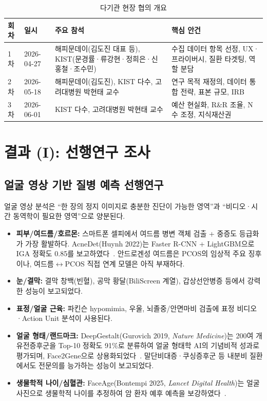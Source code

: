 \documentclass[11pt,a4paper]{article}
\begin{document}
\begin{table}[h]
\centering
\footnotesize
\renewcommand{\arraystretch}{1.25}
\caption{다기관 현장 협의 개요}
\label{tab:meetings}
\begin{tabularx}{\textwidth}{@{}p{0.8cm} p{2.0cm} L p{3.6cm}@{}}
\toprule
\textbf{회차} & \textbf{일시} & \textbf{주요 참석} & \textbf{핵심 안건} \\
\midrule
1차 & 2026-04-27 & 해피문데이(김도진 대표 등), KIST(문경률·류강현·정희은·신홍철·조수민) & 수집 데이터 항목 선정, UX·프라이버시, 질환 타겟팅, 역할 분담 \\
2차 & 2026-05-18 & 해피문데이(김도진), KIST 다수, 고려대병원 박현태 교수 & 연구 목적 재정의, 데이터 통합 전략, 표본 규모, IRB \\
3차 & 2026-06-01 & KIST 다수, 고려대병원 박현태 교수 & 예산 현실화, R\&R 조율, N수 조정, 지식재산권 \\
\bottomrule
\end{tabularx}
\end{table}

\section{결과 (I): 선행연구 조사}

\subsection{얼굴 영상 기반 질병 예측 선행연구}
얼굴 영상 분석은 ``한 장의 정지 이미지로 충분한 진단이 가능한 영역''과 ``비디오·시간 동역학이 필요한 영역''으로 양분된다.

\begin{itemize}
  \item \textbf{피부/여드름/호르몬:} 스마트폰 셀피에서 여드름 병변 객체 검출 + 중증도 등급화가 가장 활발하다. AcneDet(Huynh 2022)는 Faster R-CNN + LightGBM으로 IGA 정확도 0.85를 보고하였다~\cite{ref1}. 안드로겐성 여드름은 PCOS의 임상적 주요 징후이나, 여드름$\leftrightarrow$PCOS 직접 연계 모델은 아직 부재하다.
  \item \textbf{눈/결막:} 결막 창백(빈혈), 공막 황달(BiliScreen 계열), 갑상선안병증 등에서 강력한 성능이 보고되었다.
  \item \textbf{표정/얼굴 근육:} 파킨슨 hypomimia, 우울, 뇌졸중/안면마비 검출에 표정 비디오·Action Unit 분석이 사용된다.
  \item \textbf{얼굴 형태/랜드마크:} DeepGestalt(Gurovich 2019, \emph{Nature Medicine})는 200여 개 유전증후군을 Top-10 정확도 91\%로 분류하여 얼굴 형태학 AI의 기념비적 성과로 평가되며, Face2Gene으로 상용화되었다~\cite{ref2}. 말단비대증·쿠싱증후군 등 내분비 질환에서도 전문의를 능가하는 성능이 보고되었다.
  \item \textbf{생물학적 나이/심혈관:} FaceAge(Bontempi 2025, \emph{Lancet Digital Health})는 얼굴 사진으로 생물학적 나이를 추정하여 암 환자 예후 예측을 보강하였다~\cite{ref3}.
\end{itemize}
\end{document}
